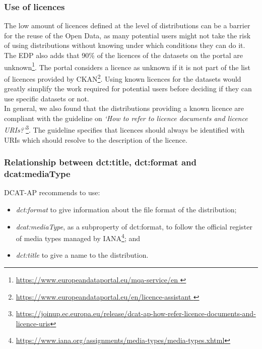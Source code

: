 \documentclass[<options>]{elsarticle}
\begin{document}
\subsubsection{Use of licences}
The low amount of licences defined at the level of distributions can be a barrier for the reuse of the Open Data, as many potential users might not take the risk of using distributions without knowing under which conditions they can do it. The EDP also adds that 90\% of the licences of the datasets on the portal are unknown\footnote{\href{https://www.europeandataportal.eu/mqa-service/en}{ https://www.europeandataportal.eu/mqa-service/en }}. The portal considers a licence as unknown if it is not part of the list of licences provided by CKAN\footnote{\href{https://www.europeandataportal.eu/en/licence-assistant}{ https://www.europeandataportal.eu/en/licence-assistant }}. Using known licences for the datasets would greatly simplify the work required for potential users before deciding if they can use specific datasets or not.\\
In general, we also found that the distributions providing a known licence are compliant with the guideline on \textit{‘How to refer to licence documents and licence URIs?’}\footnote{\href{https://joinup.ec.europa.eu/release/dcat-ap-how-refer-licence-documents-and-licence-uris}{  https://joinup.ec.europa.eu/release/dcat-ap-how-refer-licence-documents-and-licence-uris}}. The guideline specifies that licences should always be identified with URIs which should resolve to the description of the licence.

\subsubsection{Relationship between dct:title, dct:format and dcat:mediaType}
DCAT-AP recommends to use:
\begin{itemize}
\item \textit{dct:format} to give information about the file format of the distribution;
\item \textit{dcat:mediaType}, as a subproperty of dct:format, to follow the official register of media types managed by IANA\footnote{\href{ https://www.iana.org/assignments/media-types/media-types.xhtml}{   https://www.iana.org/assignments/media-types/media-types.xhtml}}; and
\item \textit{dct:title} to give a name to the distribution.
\end{itemize}
\end{document}

